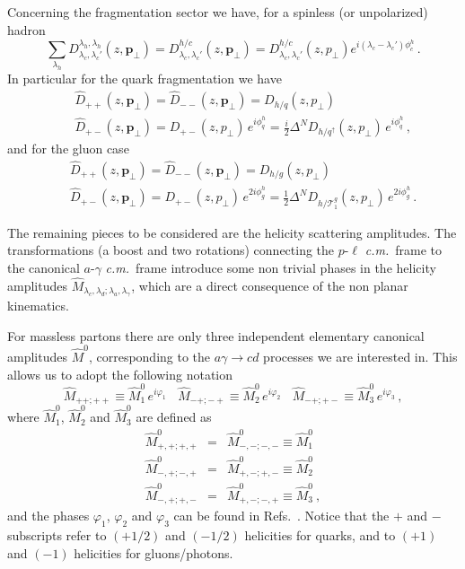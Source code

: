 \documentclass[nofootinbib,superscriptaddress,aps]{revtex4}
\newcommand{\be}{\begin{equation}}
\newcommand{\ee}{\end{equation}}
\newcommand{\bea}{\begin{eqnarray}}
\newcommand{\eea}{\end{eqnarray}}
\newcommand{\qup}{q^\uparrow}
\begin{document}
Concerning the fragmentation sector we have, for a spinless (or unpolarized) hadron
\be
\sum_{\lambda_h }D_{\lambda_c,\lambda_c'}^{\lambda_h,\lambda_h}(z,\bm{p}_\perp) = D_{\lambda_c,\lambda_c'}^{h/c}(z,\bm{p}_\perp) = D_{\lambda_c,\lambda_c'}^{h/c}(z,p_\perp) e^{i(\lambda_c-\lambda_c')\phi_c^h}\,.
\ee
In particular for the quark fragmentation we have
%
\bea
&& \hat D_{++}(z,\bm{p}_{\perp}) = \hat D_{--}(z,\bm{p}_{\perp}) =
D_{h/q}(z,p_{\perp}) \\
&& \hat D_{+-}(z,\bm{p}_{\perp}) = D_{+-}(z,p_{\perp}) \, e^{i\phi_q^h} =
\frac{i}{2}\Delta^N\! D_{h/\qup}(z,p_{\perp})\, e^{i\phi_q^h} \,,
\eea
%
and for the gluon case
\bea
&& \hat D_{++}(z,\bm{p}_{\perp}) = \hat D_{--}(z,\bm{p}_{\perp}) =
D_{h/g}(z,p_{\perp}) \\
&& \hat D_{+-}(z,\bm{p}_{\perp}) = D_{+-}(z,p_{\perp}) \, e^{2i\phi_g^h} =
\frac{1}{2}\Delta^N\! D_{h/\mathcal{T}_1^g}(z,p_{\perp})\, e^{2i\phi_g^h} \,.
\eea

The remaining pieces to be considered are the helicity scattering amplitudes. The
transformations (a boost and two rotations) connecting the $p$-$\ell$ \emph{c.m.}~frame to the canonical $a$-$\gamma$ \emph{c.m.}~frame introduce some non trivial phases in the helicity amplitudes $\hat M_{\lambda^{\,}_c, \lambda^{\,}_d; \lambda^{\,}_a, \lambda^{\,}_\gamma}$, which
are a direct consequence of the non planar kinematics.

For massless partons there are only three independent elementary canonical amplitudes $\hat M^0$, corresponding to the $a\gamma\to cd$ processes we are interested in. This allows us to adopt the following notation
\be
\hat M_{++;++}  \equiv  \hat M_1^0 \,e^{i\varphi_1}\>\>\>\>
\hat M_{-+;-+}  \equiv  \hat M_2^0 \,e^{i\varphi_2}\>\>\>\> \label{phases}
\hat M_{-+;+-}  \equiv  \hat M_3^0 \,e^{i\varphi_3}\,,
\ee
where  $\hat M_1^0$, $\hat M_2^0$ and $\hat M_3^0$ are defined as
%
\bea
\hat M^0_{+,+;+,+} &=& \hat M^0_{-,-;-,-} \equiv \hat M_1^0 \nonumber\\
\hat M^0_{-,+;-,+} &=& \hat M^0_{+,-;+,-}\equiv \hat M_2^0 \nonumber\\
\hat M^0_{-,+;+,-} &=& \hat M^0_{+,-;-,+}\equiv \hat M_3^0 \>, \label{Mqq}
\eea
%
and the phases $\varphi_1$, $\varphi_2$ and $\varphi_3$ can be found in Refs.~\cite{Anselmino:2004ky,Anselmino:2005sh}.
Notice that the $+$ and $-$ subscripts refer to $(+1/2)$ and $(-1/2)$ helicities for quarks, and to $(+1)$ and $(-1)$ helicities for gluons/photons.
\end{document}
